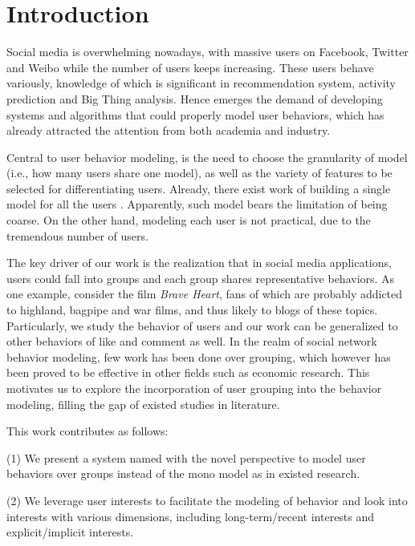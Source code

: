 \section{Introduction}
\label{sec:intro}

Social media is overwhelming nowadays, with massive users on Facebook, Twitter and Weibo while the number of users keeps increasing.
These users behave variously, knowledge of which is significant in recommendation system, activity prediction and Big Thing analysis.
Hence emerges the demand of developing systems and algorithms that could properly model user behaviors, which has already attracted the attention from both academia and industry.

Central to user behavior modeling, is the need to choose the granularity of model (i.e., how many users share one model), as well as the variety of features to be selected for differentiating users. 
Already, there exist work of building a single model for all the users \cite{IEEEexample:conf/wsdm/FengW13,IEEEexample:conf/ijcai/ZhangLTCL13,IEEEexample:journals/tkdd/ZhangTLLX15}.
Apparently, such model bears the limitation of being coarse.
On the other hand, modeling each user is not practical, due to the tremendous number of users.

The key driver of our work is the realization that in social media applications, users could fall into groups and each group shares representative behaviors.
%
As one example, consider the film \textit{Brave Heart}, fans of which are probably addicted to highland, bagpipe and war films, and thus likely to \ret{} blogs of these topics.
Particularly, we study the \retg{} behavior of users and our work can be generalized to other behaviors of like and comment as well. 
In the realm of social network behavior modeling, few work has been done over grouping, which however has been proved to be effective in other fields such as economic research.
This motivates us to explore the incorporation of user grouping into the \retg{} behavior modeling, filling the gap of existed studies in literature.

This work contributes as follows:

\stab(1) We present a system named \sys{} with the novel perspective to model user behaviors over groups instead of the mono model as in existed research.

\stab(2) We leverage user interests to facilitate the modeling of \retg{} behavior and look into interests with various dimensions, including long-term/recent interests and explicit/implicit interests.

